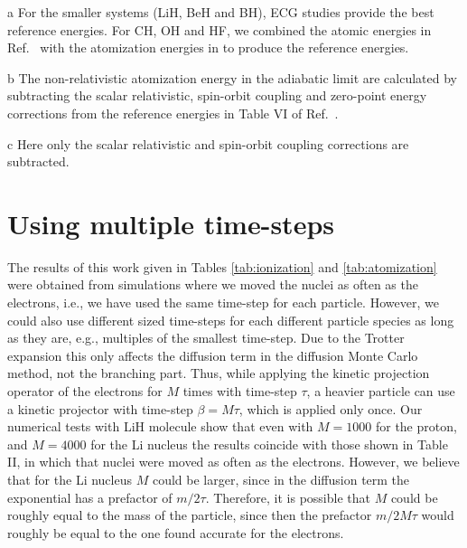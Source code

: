 \documentclass[pra,superscriptaddress,groupedaddress,twocolumn]{revtex4}
\begin{document}
\begin{table}[t!]
\begin{threeparttable}
\begin{tabular*}{\textwidth}{@{\extracolsep{\fill}} cccccccc}
\hline\hline
\end{tabular*}
\begin{tablenotes}
\item[a] For the smaller systems (LiH, BeH and BH), ECG studies provide the best reference energies. For CH, OH and HF, we combined the atomic energies in Ref.~\cite{Davidson_Atoms} with the atomization energies in \cite{Feller_Corrections} to produce the reference energies.
\item[b] The non-relativistic atomization energy in the adiabatic limit are calculated by subtracting the scalar relativistic, spin-orbit coupling and zero-point energy corrections from the reference energies in Table VI of Ref.~\cite{Feller_Corrections}.
\item[c] Here only the scalar relativistic and spin-orbit coupling corrections are subtracted.
\end{tablenotes}
\end{threeparttable}
\end{table} 


\section{Using multiple time-steps}
The results of this work given in Tables \ref{tab:ionization} and \ref{tab:atomization} were obtained from simulations where we moved the nuclei as often as the electrons, i.e., we have used the same time-step for each particle. However, we could also use different sized time-steps for each different particle species as long as they are, e.g., multiples of the smallest time-step. Due to the Trotter expansion \cite{lester1} this only affects the diffusion term in the diffusion Monte Carlo method, not the branching part. Thus, while applying the kinetic projection operator of the electrons for $M$ times with time-step $\tau$, a heavier particle can use a kinetic projector with time-step $\beta=M\tau$, which is applied only once. Our numerical tests with LiH molecule show that even with $M=1000$ for the proton, and $M=4000$ for the Li nucleus the results coincide with those shown in Table II, in which that nuclei were moved as often as the electrons. However, we believe that for the Li nucleus $M$ could be larger, since in the diffusion term the exponential has a prefactor of $m/2\tau$. Therefore, it is possible that $M$ could be roughly equal to the mass of the particle, since then the prefactor $m/2M\tau$ would roughly be equal to the one found accurate for the electrons.
\end{document}
